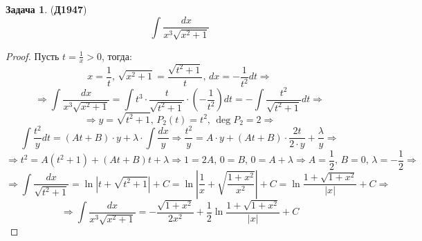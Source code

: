 \documentclass[12pt]{article}
\theoremstyle{definition}
\newtheorem{problem}{Задача}
\DeclareMathOperator{\dint}{\displaystyle\int}
\begin{document}
\begin{problem}(\textbf{Д1947})
	$$
		\dint \dfrac{dx}{x^3\sqrt{x^2 +1}}
	$$
\end{problem}
\begin{proof}
	Пусть $t = \tfrac{1}{x} > 0$, тогда:
	$$
		x = \dfrac{1}{t}, \, \sqrt{x^2 + 1} = \dfrac{\sqrt{t^2 + 1}}{t}, \, dx = - \dfrac{1}{t^2}dt \Rightarrow
	$$
	$$
		\Rightarrow \dint \dfrac{dx}{x^3\sqrt{x^2 +1}} = \dint t^3{\cdot}\dfrac{t}{\sqrt{t^2 + 1}}{\cdot}\left(-\dfrac{1}{t^2}\right)dt =-\dint \dfrac{t^2}{\sqrt{t^2 + 1}}dt \Rightarrow
	$$
	$$
		\Rightarrow y = \sqrt{t^2 + 1}, \, P_2(t) = t^2,\, \deg{P_2} = 2 \Rightarrow 
	$$
	$$
		\dint \dfrac{t^2}{y}dt = (At + B){\cdot}y + \lambda{\cdot}\dint\dfrac{dx}{y} \Rightarrow \dfrac{t^2}{y} = A{\cdot}y + (At + B){\cdot}\dfrac{2t}{2{\cdot}y} + \dfrac{\lambda}{y} \Rightarrow
	$$
	$$
		\Rightarrow t^2 = A(t^2 + 1) + (At + B)t + \lambda \Rightarrow 1 = 2A, \, 0 = B, \, 0 = A + \lambda \Rightarrow A = \dfrac{1}{2}, \, B = 0,\, \lambda = -\dfrac{1}{2} \Rightarrow
	$$
	$$
		\Rightarrow \dint \dfrac{dx}{\sqrt{t^2 + 1}} = \ln{\left|t + \sqrt{t^2 + 1} \right|} + C = \ln{\left|\dfrac{1}{x} + \sqrt{\dfrac{1 + x^2}{x^2}} \right|} + C = \ln{\dfrac{1 + \sqrt{1 + x^2}}{|x|}} + C \Rightarrow
	$$
	$$
		\Rightarrow \dint \dfrac{dx}{x^3\sqrt{x^2 +1}} = -\dfrac{\sqrt{1 + x^2}}{2x^2} +\dfrac{1}{2}\ln{\dfrac{1 + \sqrt{1 + x^2}}{|x|}} + C 
	$$
\end{proof}
\end{document}
